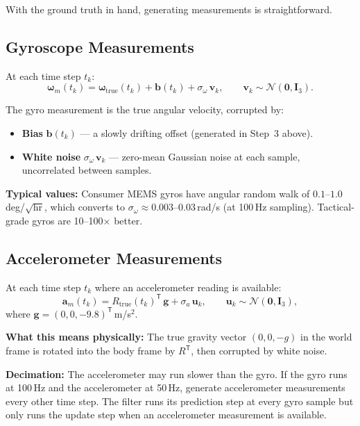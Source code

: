 \documentclass[11pt,letterpaper]{article}
\newcommand{\eye}{\mathbf{I}}
\begin{document}
With the ground truth in hand, generating measurements is
straightforward.

\subsection{Gyroscope Measurements}

At each time step $t_k$:
\[
  \boxed{
  \bm{\omega}_m(t_k)
  = \bm{\omega}_{\mathrm{true}}(t_k)
    + \mathbf{b}(t_k)
    + \sigma_{\omega} \, \mathbf{v}_k,
  \qquad \mathbf{v}_k \sim \mathcal{N}(\mathbf{0}, \eye_3).
  }
\]

The gyro measurement is the true angular velocity, corrupted by:
\begin{itemize}[nosep]
  \item \textbf{Bias} $\mathbf{b}(t_k)$ --- a slowly drifting
    offset (generated in Step~3 above).
  \item \textbf{White noise}
    $\sigma_{\omega}\,\mathbf{v}_k$ --- zero-mean Gaussian noise
    at each sample, uncorrelated between samples.
\end{itemize}

\textbf{Typical values:}  Consumer MEMS gyros have angular random
walk of $0.1$--$1.0$\,deg/$\sqrt{\text{hr}}$, which converts to
$\sigma_{\omega} \approx 0.003$--$0.03$\,rad/s (at 100\,Hz
sampling).  Tactical-grade gyros are 10--100$\times$ better.

\subsection{Accelerometer Measurements}

At each time step $t_k$ where an accelerometer reading is available:
\[
  \boxed{
  \mathbf{a}_m(t_k)
  = R_{\mathrm{true}}(t_k)^{\mathsf{T}} \, \mathbf{g}
    + \sigma_a \, \mathbf{u}_k,
  \qquad \mathbf{u}_k \sim \mathcal{N}(\mathbf{0}, \eye_3),
  }
\]
where $\mathbf{g} = (0, 0, -9.8)^{\mathsf{T}}$\,m/s$^{2}$.

\textbf{What this means physically:}  The true gravity vector
$(0, 0, -g)$ in the world frame is rotated into the body frame by
$R^{\mathsf{T}}$, then corrupted by white noise.

\textbf{Decimation:}  The accelerometer may run slower than the
gyro.  If the gyro runs at 100\,Hz and the accelerometer at 50\,Hz,
generate accelerometer measurements every other time step.  The
filter runs its prediction step at every gyro sample but only runs
the update step when an accelerometer measurement is available.
\end{document}
